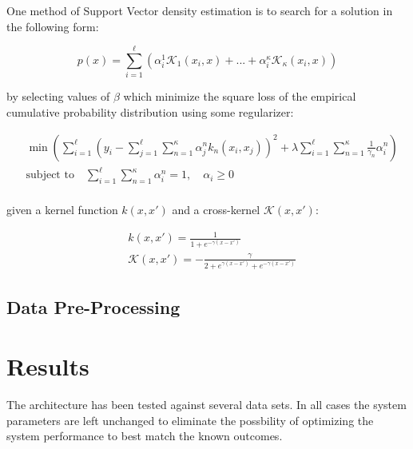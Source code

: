 \documentclass[10pt]{article}
\begin{document}
One method of Support Vector density estimation is to search for a solution in the following form:

\begin{equation} \label{eq:SVDensity}
p(x) = \sum_{i=1}^\ell \left( \alpha_i^1 \mathcal{K}_1(x_i,x) + ... + \alpha_i^\kappa \mathcal{K}_\kappa( x_i,x) \right)
\end{equation}

by selecting values of \( \beta \) which minimize the square loss of the empirical cumulative probability distribution using some regularizer:

\begin{align}
&\min \left( \sum_{i=1}^\ell \left( y_i - \sum_{j=1}^\ell \sum_{n=1}^\kappa \alpha_j^n k_n(x_i, x_j) \right)^2 + \lambda \sum_{i=1}^\ell \sum_{n=1}^\kappa \frac{1}{\gamma_n} \alpha_i^n \right) \\
&\text{subject to} \quad \sum_{i=1}^\ell \sum_{n=1}^\kappa \alpha_i^n = 1, \quad \alpha_i \ge 0 \\
\end{align}

given a kernel function \( k(x,x') \) and a cross-kernel \( \mathcal{K}(x,x') \):

\begin{align}
&k(x,x') = \frac{1}{1+e^{-\gamma(x-x')} } \\
&\mathcal{K}(x,x') = -\frac{\gamma}{2 + e^{\gamma(x-x')} + e^{-\gamma(x-x')} } 
\end{align}


\subsection{Data Pre-Processing}




\section{Results}
The architecture has been tested against several data sets.  In all cases the system parameters are left unchanged to eliminate the possbility of optimizing the system performance to best match the known outcomes.
\end{document}
